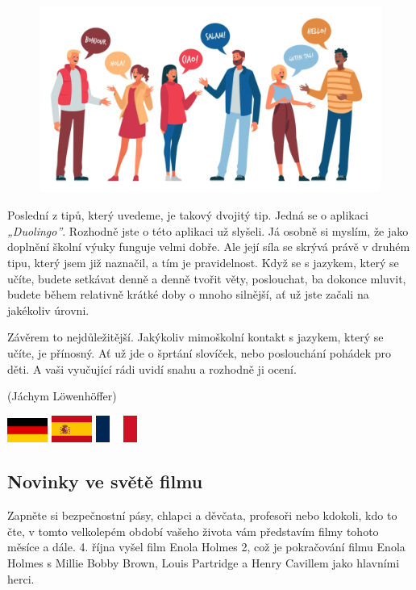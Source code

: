 \documentclass[12pt, a4paper]{article}
\begin{document}
\begin{multicols*}{2}
	\begin{figure}[H]
   		\centering
 		\includegraphics[width=.45\textwidth]{4}
		\bigskip
	\end{figure}
		Poslední z tipů, který uvedeme, je takový dvojitý tip. Jedná se o aplikaci \emph{„Duolingo”}. Rozhodně jste o této aplikaci už slyšeli. Já osobně si myslím, že jako doplnění školní výuky funguje velmi dobře. Ale její síla se skrývá právě v druhém tipu, který jsem již naznačil, a tím je pravidelnost. Když se s jazykem, který se učíte, budete setkávat denně a denně tvořit věty, poslouchat, ba dokonce mluvit, budete během relativně krátké doby o mnoho silnější, ať už jste začali na jakékoliv úrovni. \par
		Závěrem to nejdůležitější. Jakýkoliv mimoškolní kontakt s jazykem, který se učíte, je přínosný. Ať už jde o šprtání slovíček, nebo poslouchání pohádek pro děti. A vaši vyučující rádi uvidí snahu a rozhodně ji ocení. 
		\par \begin{flushright}
			 \footnotesize (Jáchym Löwenhöffer)
		\end{flushright}
		\begin{multicols}{3}
			\begin{center}
				\includegraphics[width=0.1\textwidth]{G}
				\includegraphics[width=0.1\textwidth]{S}
				\includegraphics[width=0.1\textwidth]{FR}
			\end{center}
		\end{multicols}

		\begin{center}\section*{Novinky ve světě filmu} \end{center}
		Zapněte si bezpečnostní pásy, chlapci a děvčata, profesoři nebo kdokoli, kdo to čte, v tomto velkolepém období vašeho života vám představím filmy tohoto měsíce a dále. 4. října vyšel film Enola Holmes 2, což je pokračování filmu Enola Holmes s Millie Bobby Brown, Louis Partridge a Henry Cavillem jako hlavními herci. \par


\end{multicols*}
\end{document}
